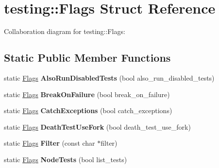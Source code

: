 \hypertarget{structtesting_1_1Flags}{}\section{testing\+:\+:Flags Struct Reference}
\label{structtesting_1_1Flags}


Collaboration diagram for testing\+:\+:Flags\+:
\subsection*{Static Public Member Functions}
\begin{DoxyCompactItemize}
\item 
\mbox{\label{structtesting_1_1Flags_a8bee2b5f94d8248b6791d6b005db146f}} 
static \hyperlink{structtesting_1_1Flags}{Flags} {\bfseries Also\+Run\+Disabled\+Tests} (bool also\+\_\+run\+\_\+disabled\+\_\+tests)
\item 
\mbox{\label{structtesting_1_1Flags_a62660e44922321f7640bc951a04c2296}} 
static \hyperlink{structtesting_1_1Flags}{Flags} {\bfseries Break\+On\+Failure} (bool break\+\_\+on\+\_\+failure)
\item 
\mbox{\label{structtesting_1_1Flags_a2c7d89f62f4328ae0ced66154ef96b44}} 
static \hyperlink{structtesting_1_1Flags}{Flags} {\bfseries Catch\+Exceptions} (bool catch\+\_\+exceptions)
\item 
\mbox{\label{structtesting_1_1Flags_a4468e5625833043596c44be174349d8c}} 
static \hyperlink{structtesting_1_1Flags}{Flags} {\bfseries Death\+Test\+Use\+Fork} (bool death\+\_\+test\+\_\+use\+\_\+fork)
\item 
\mbox{\label{structtesting_1_1Flags_afc7350b7c1ac4c0e0efe2d9a94729eb7}} 
static \hyperlink{structtesting_1_1Flags}{Flags} {\bfseries Filter} (const char $\ast$filter)
\item 
\mbox{\label{structtesting_1_1Flags_a825a5d763a31fe6c28f543990bd336df}} 
static \hyperlink{structtesting_1_1Flags}{Flags} {\bfseries Node\+Tests} (bool list\+\_\+tests)
\item 
\mbox{\label{structtesting_1_1Flags_a507916734a6d7ff2dd02891d7849f2d3}} 

\end{DoxyCompactItemize}

